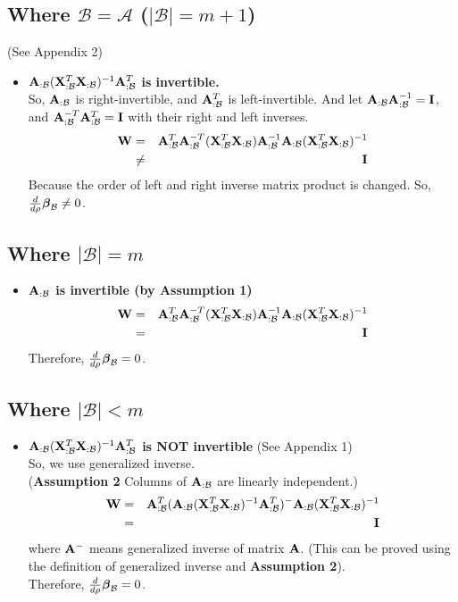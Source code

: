 \documentclass{article}
\newcommand{\bA}{{\bf A}}
\newcommand{\bX}{{\bf X}}
\newcommand{\bW}{{\bf W}}
\newcommand{\bI}{{\bf I}}
\newcommand{\bbeta}{\mbox{\boldmath{$\beta$}}}
\newcommand{\bean}{\begin{eqnarray*}}
\newcommand{\eean}{\end{eqnarray*}}
\newcommand{\bed}{\begin{itemize}}
\newcommand{\eed}{\end{itemize}}
\begin{document}
\subsection{Where $\mathcal{B} = \mathcal{A}$ ($|\mathcal{B}| = m + 1$)}
(See Appendix 2)
\bed
    \item $\bA_{:\mathcal{B}} (\bX_{:\mathcal{B}}^T \bX_{:\mathcal{B}})^{-1} \bA_{:\mathcal{B}}^T$ \textbf{is invertible.} \\
    So, $\bA_{:\mathcal{B}}$ is right-invertible, and $\bA_{:\mathcal{B}}^T$ is left-invertible.
    And let $\bA_{:\mathcal{B}} \bA_{:\mathcal{B}}^{-1} = \bI$, and $\bA_{:\mathcal{B}}^{-T} \bA_{:\mathcal{B}}^{T} = \bI$ with their right and left inverses.
    \bean
    \bW &=& \bA_{:\mathcal{B}}^T \bA_{:\mathcal{B}}^{-T} (\bX_{:\mathcal{B}}^T \bX_{:\mathcal{B}}) \bA_{:\mathcal{B}}^{-1} \bA_{:\mathcal{B}} (\bX_{:\mathcal{B}}^T \bX_{:\mathcal{B}})^{-1} \\
    &\neq& \bI
    \eean
    Because the order of left and right inverse matrix product is changed.
    So, $\frac{d}{d\rho}\bbeta_{\mathcal{B}} \neq 0$.\\
\eed

\subsection{Where $|\mathcal{B}| = m$}
\bed
    \item \textbf{$\bA_{:\mathcal{B}}$ is invertible (by Assumption 1)} \\
    \bean
    \bW &=& \bA_{:\mathcal{B}}^T \bA_{:\mathcal{B}}^{-T} (\bX_{:\mathcal{B}}^T \bX_{:\mathcal{B}}) \bA_{:\mathcal{B}}^{-1} \bA_{:\mathcal{B}} (\bX_{:\mathcal{B}}^T \bX_{:\mathcal{B}})^{-1} \\
    &=& \bI
    \eean
    Therefore, $\frac{d}{d\rho}\bbeta_{\mathcal{B}} = 0$.\\
\eed

\subsection{Where $|\mathcal{B}| < m$}
\bed
    \item \textbf{$\bA_{:\mathcal{B}} (\bX_{:\mathcal{B}}^T \bX_{:\mathcal{B}})^{-1} \bA_{:\mathcal{B}}^T$ is NOT invertible} (See Appendix 1) \\
    So, we use generalized inverse. \\
    (\textbf{Assumption 2} Columns of $\bA_{:\mathcal{B}}$ are linearly independent.)
    \bean
    \bW &=& \bA_{:\mathcal{B}}^T (\bA_{:\mathcal{B}} (\bX_{:\mathcal{B}}^T \bX_{:\mathcal{B}})^{-1} \bA_{:\mathcal{B}}^T)^{-} \bA_{:\mathcal{B}} (\bX_{:\mathcal{B}}^T \bX_{:\mathcal{B}})^{-1} \\
    &=& \bI
    \eean
    where $\bA^{-}$ means generalized inverse of matrix $\bA$.
    (This can be proved using the definition of generalized inverse and \textbf{Assumption 2}). \\
    Therefore, $\frac{d}{d\rho}\bbeta_{\mathcal{B}} = 0$.
\eed
\end{document}
